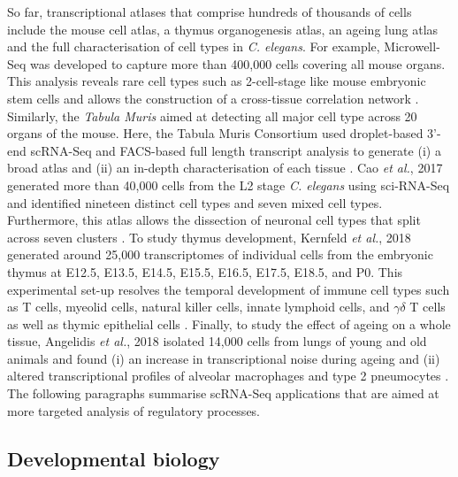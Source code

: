 So far, transcriptional atlases that comprise hundreds of thousands of cells include the mouse cell atlas, a thymus organogenesis atlas, an ageing lung atlas and the full characterisation of cell types in \textit{C. elegans}. For example, Microwell-Seq was developed to capture more than 400,000 cells covering all mouse organs. This analysis reveals rare cell types such as 2-cell-stage like mouse embryonic stem cells and allows the construction of a cross-tissue correlation network \cite{Han2018}. Similarly, the \emph{Tabula Muris} aimed at detecting all major cell type across 20 organs of the mouse. Here, the Tabula Muris Consortium used droplet-based 3'-end scRNA-Seq and FACS-based full length transcript analysis to generate (i) a broad atlas and (ii) an in-depth characterisation of each tissue \citep{Quake2018}. Cao \emph{et al.}, 2017 generated more than 40,000 cells from the L2 stage \emph{C. elegans} using sci-RNA-Seq and identified nineteen distinct cell types and seven mixed cell types. Furthermore, this atlas allows the dissection of neuronal cell types that split across seven clusters \citep{Cao2017}. To study thymus development, Kernfeld \emph{et al.}, 2018 generated around 25,000 transcriptomes of individual cells from the embryonic thymus at E12.5, E13.5, E14.5, E15.5, E16.5, E17.5, E18.5, and P0. This experimental set-up resolves the temporal development of immune cell types such as T cells, myeolid cells, natural killer cells, innate lymphoid cells, and $\gamma{}\delta{}$ T cells as well as thymic epithelial cells \citep{Kernfeld2018}. Finally, to study the effect of ageing on a whole tissue, Angelidis \emph{et al.}, 2018 isolated 14,000 cells from lungs of young and old animals and found (i) an increase in transcriptional noise during ageing and (ii) altered transcriptional profiles of alveolar macrophages and type 2 pneumocytes \citep{Angelidis2018}.\\

The following paragraphs summarise scRNA-Seq applications that are aimed at more targeted analysis of regulatory processes.

\subsection{Developmental biology}

